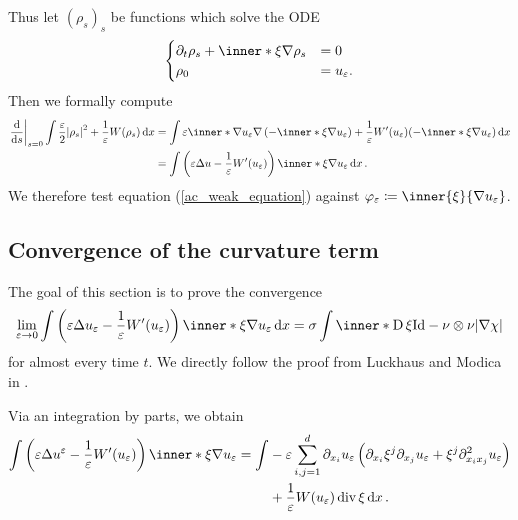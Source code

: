 Thus let $ ( \rho_{ s } )_{ s } $ be functions which solve the ODE
\[
	\begin{cases}
	\partial_{ t } \rho_{ s } 
	+
	\inner*{ \xi }{ \nabla \rho_{ s } }
	& = 0
	\\
	\rho_{ 0 } & = u_{ \varepsilon }.
	\end{cases}
\]
Then we formally compute 
\begin{align*}
	\left.\dv{ s }\right|_{ s = 0 }
		\int
			\frac{ \varepsilon }{ 2 }
			\abs{ \rho_{ s } }^{ 2 }
			+
			\frac{ 1 }{ \varepsilon }
			W ( \rho_{ s } )
		\dd{ x }
	& =
	\int
		\varepsilon 
		\inner*{ \nabla u_{ \varepsilon } }
		{ \nabla \left( - \inner*{ \xi }{ \nabla u_{ \varepsilon } } \right) }
		+
		\frac{ 1 }{ \varepsilon }
		W'( u_{ \varepsilon } ) ( -\inner*{ \xi }{ \nabla u_{ \varepsilon } } )
	\dd{ x }
	\\
	& =
	\int
		\left(
			\varepsilon \Delta u - \frac{ 1 }{ \varepsilon } W'( u_{ \varepsilon } )
		\right)
		\inner*{ \xi }{ \nabla u_{ \varepsilon } } 
	\dd{ x }.
\end{align*}
We therefore test equation (\ref{ac_weak_equation}) against $ \varphi_{ \varepsilon } \coloneqq \inner{ \xi }{ \nabla u_{ \varepsilon } } $.

\subsection{Convergence of the curvature term}

The goal of this section is to prove the convergence
\begin{equation*}
	\lim_{ \varepsilon \to 0 }
		\int
			\left(
				\varepsilon \Delta u_{ \varepsilon }
				- 
				\frac{ 1 }{ \varepsilon }
				W'( u_{ \varepsilon } )
			\right)
			\inner*{ \xi }{ \nabla u_{ \varepsilon } }
		\dd{ x }
	=
	\sigma
	\int
		\inner*{ \diff \xi }{ \mathrm{Id} - \nu \otimes \nu }
	\abs{ \nabla \chi }
\end{equation*} 
for almost every time $ t $. We directly follow the proof from Luckhaus and Modica in \cite{luckhaus_modica_gibbs_thompson_relation}.

Via an integration by parts, we obtain
\begin{align}
	\label{conv_of_curv_first_ibp_scalar}
	\int
		\left(
			\varepsilon \Delta u^{ \varepsilon }
			-
			\frac{ 1 }{ \varepsilon } W'(u_{ \varepsilon } ) 
		\right)
		\inner*{ \xi }{ \nabla u_{ \varepsilon } }
	= 
	\int
		& - \varepsilon 
		\sum_{ i, j = 1 }^{ d }
			\partial_{ x_{ i } } u_{ \varepsilon }
			\left(
				\partial_{ x_{ i } } \xi^{ j }
				\partial_{ x_{ j } } u_{ \varepsilon }
				+
				\xi^{ j }
				\partial_{ x_{ i } x_{ j } }^{ 2 } u_{ \varepsilon }
			\right)
	\notag
	\\
	& +
		\frac{ 1 }{ \varepsilon }
		W ( u_{ \varepsilon } )
		\divg \xi 
	\dd{ x }.
\end{align}

